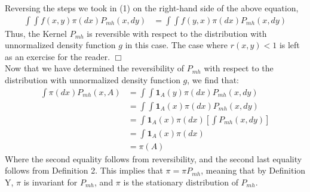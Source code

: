 \documentclass[10pt]{article}
\begin{document}
Reversing the steps we took in (1) on the right-hand side of the above equation,
\begin{align*}
    \int \int f \left( x, y \right) \pi \left( dx \right) P_{mh} \left( x, dy \right) &= \int \int f \left( y, x \right) \pi \left( dx \right) P_{mh} \left( x, dy \right)
\end{align*}
Thus, the Kernel $P_{mh}$ is reversible with respect to the distribution with unnormalized density function $g$ in this case. The case where $r \left( x, y \right) < 1$ is left as an exercise for the reader.     $\Box$
\\[1\baselineskip]
Now that we have determined the reversibility of $P_{mh}$ with respect to the distribution with unnormalized density function $g$, we find that:
\begin{align*}
    \int \pi \left( dx \right) P_{mh} \left( x, A \right) &= \int \int \mathbf{1}_{A} \left( y \right) \pi \left( dx \right) P_{mh} \left( x, dy \right) \\[1em]
    &= \int \int \mathbf{1}_{A} \left( x \right) \pi \left( dx \right) P_{mh} \left( x, dy \right) \\[1em]
    &= \int \mathbf{1}_{A} \left( x \right) \pi \left( dx \right) \left[ \int P_{mh} \left( x, dy \right)  \right] \\[1em]
    &= \int \mathbf{1}_{A} \left( x \right) \pi \left( dx \right) \\[1em]
    &= \pi \left( A \right)
\end{align*}
\noindent
Where the second equality follows from reversibility, and the second last equality follows from Definition 2. This implies that $\pi = \pi P_{mh}$, meaning that by Definition Y, $\pi$ is invariant for $P_{mh}$, and $\pi$ is the stationary distribution of $P_{mh}$.
\end{document}

